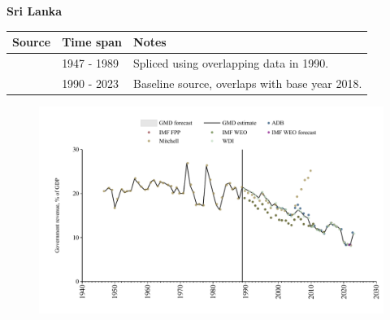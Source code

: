 \documentclass[12pt,a4paper,landscape]{article}
\begin{document}
\begin{adjustbox}{max totalsize={\paperwidth}{\paperheight},center}
\begin{minipage}[t][\textheight][t]{\textwidth}
\vspace*{0.5cm}
{}
\begin{center}
{\Large\bfseries Sri Lanka}
\end{center}
\vspace{0.5cm}
\begin{table}[H]
\centering
\small
\begin{tabular}{|l|l|l|}
\hline
\textbf{Source} & \textbf{Time span} & \textbf{Notes} \\
\hline
\rowcolor{white}\cite{Mitchell}& 1947 - 1989 &Spliced using overlapping data in 1990.\\
\rowcolor{lightgray}\cite{WDI}& 1990 - 2023 &Baseline source, overlaps with base year 2018.\\
\hline
\end{tabular}
\end{table}
\begin{figure}[H]
\centering
\includegraphics[width=\textwidth,height=0.6\textheight,keepaspectratio]{graphs/LKA_govrev_GDP.pdf}
\end{figure}
\end{minipage}
\end{adjustbox}
\end{document}

